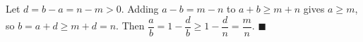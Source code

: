 Let $d=b-a=n-m>0$. Adding $a-b=m-n$ to $a+b\ge m+n$ gives $a\ge m$, so $b=a+d\ge m+d=n$. Then $\dfrac ab=1-\dfrac db\ge1-\dfrac dn=\dfrac mn$. $\blacksquare$
